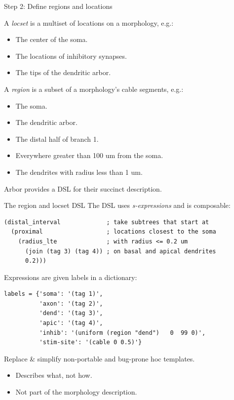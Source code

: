 \documentclass[aspectratio=43]{beamer}
\newcommand{\arbor}{{\ttfamily Arbor}\xspace}
\begin{document}
\begin{frame}[fragile]{Step 2: Define regions and locations}

    A \emph{locset} is a multiset of locations on a morphology, e.g.:
    \begin{itemize}
        \item The center of the soma.
        \item The locations of inhibitory synapses.
        \item The tips of the dendritic arbor.
    \end{itemize}
    \vspace{5pt}

    A \emph{region} is a subset of a morphology's cable segments, e.g.:
    \begin{itemize}
        \item The soma.
        \item The dendritic arbor.
        \item The distal half of branch 1.
        \item Everywhere greater than 100 um from the soma.
        \item The dendrites with radius less than 1 um.
    \end{itemize}
    \vspace{5pt}
    \arbor provides a DSL for their succinct description.

\end{frame}

\begin{frame}[fragile]{The region and locset DSL}
    The DSL uses \emph{s-expressions} and is composable:

    \begin{lstlisting}[style=arblang]
(distal_interval             ; take subtrees that start at
  (proximal                  ; locations closest to the soma
    (radius_lte              ; with radius <= 0.2 um
      (join (tag 3) (tag 4)) ; on basal and apical dendrites
      0.2)))
    \end{lstlisting}

    Expressions are given labels in a dictionary:

    \begin{lstlisting}[style=talkpython]
labels = {'soma': '(tag 1)',
          'axon': '(tag 2)',
          'dend': '(tag 3)',
          'apic': '(tag 4)',
          'inhib': '(uniform (region "dend")   0  99 0)',
          'stim-site': '(cable 0 0.5)'}
    \end{lstlisting}

    Replace \& simplify non-portable and bug-prone hoc templates.
    \begin{itemize}
        \item Describes what, not how.
        \item Not part of the morphology description.
    \end{itemize}

\end{frame}
\end{document}

